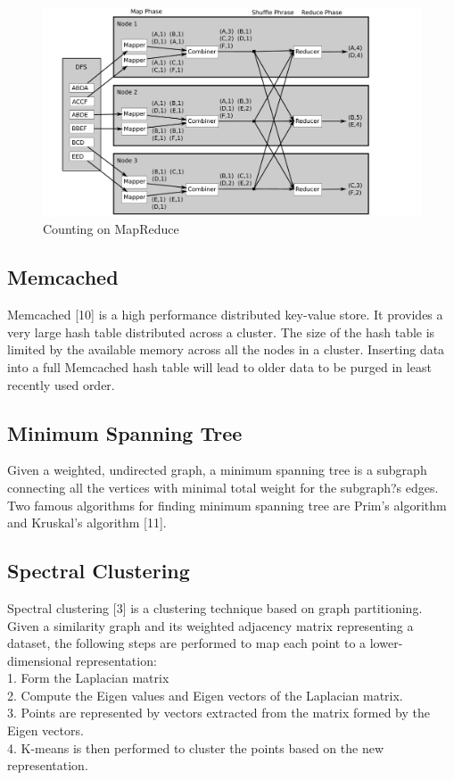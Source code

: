\documentclass{vldb}
\begin{document}
\begin{figure}
\centering
\includegraphics[scale=0.3]{fig1}
\caption{Counting on MapReduce}
\label{fig:fig1}
\end{figure}

\subsection{Memcached}
Memcached [10] is a high performance distributed key-value store. It provides a very large hash table distributed across a cluster. The size of the hash table is limited by the available memory across all the nodes in a cluster. Inserting data into a full Memcached hash table will lead to older data to be purged in least recently used order.

\subsection{Minimum Spanning Tree}
Given a weighted, undirected graph, a minimum spanning tree is a subgraph connecting all the vertices with minimal total weight for the subgraph?s edges. Two famous algorithms for finding minimum spanning tree are Prim's algorithm and Kruskal's algorithm [11].

\subsection{Spectral Clustering}
Spectral clustering [3] is a clustering technique based on graph partitioning. Given a similarity graph and its weighted adjacency matrix representing a dataset, the following steps are performed to map each point to a lower-dimensional representation:\\
1. Form the Laplacian matrix\\
2. Compute the Eigen values and Eigen vectors of the Laplacian matrix.\\
3. Points are represented by vectors extracted from the matrix formed by the Eigen vectors.\\
4. K-means is then performed to cluster the points based on the new representation.
\end{document}
